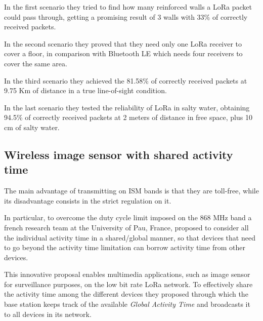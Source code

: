 In the first scenario they tried to find how many reinforced walls a LoRa packet could pass through, getting a promising result of 3 walls with 33\% of correctly received packets.

In the second scenario they proved that they need only one LoRa receiver to cover a floor, in comparison with Bluetooth LE which needs four receivers to cover the same area.

In the third scenario they achieved the 81.58\% of correctly received packets at 9.75 Km of distance in a true line-of-sight condition.

In the last scenario they tested the reliability of LoRa in salty water, obtaining 94.5\% of correctly received packets at 2 meters of distance in free space, plus 10 cm of salty water.\cite{safetylora}

\subsection{Wireless image sensor with shared activity time}
The main advantage of transmitting on ISM bands is that they are toll-free, while its disadvantage consists in the strict regulation on it. 

In particular, to overcome the duty cycle limit imposed on the 868 MHz band a french research team at the University of Pau, France, proposed to consider all the individual activity time in a shared/global manner, so that devices that need to go beyond the activity time limitation can borrow activity time from other devices.

This innovative proposal enables multimedia applications, such as image sensor for surveillance purposes, on the low bit rate LoRa network. To effectively share the activity time among the different devices they proposed through which the base station keeps track of the available \emph{Global Activity Time} and broadcasts it to all devices in its network.\cite{imagesensor}

